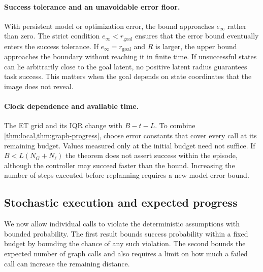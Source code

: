 \documentclass{article} %
\theoremstyle{definition}
\theoremstyle{remark}
\begin{document}
\paragraph{Success tolerance and an unavoidable error floor.}
With persistent model or optimization error, the bound approaches $e_\infty$ rather
than zero. The strict condition $e_\infty<r_{\mathrm{goal}}$ ensures that the error bound
eventually enters the success tolerance. If $e_\infty=r_{\mathrm{goal}}$ and $R$ is larger,
the upper bound approaches the boundary without reaching it in finite time.
If unsuccessful states can lie arbitrarily close to the goal latent, no positive
latent radius guarantees task success. This matters when the goal depends on
state coordinates that the image does not reveal.

\paragraph{Clock dependence and available time.}
The ET grid and its IQR change with $B-t-L$.
To combine \cref{thm:local,thm:graph-progress}, choose error constants that cover every
call at its remaining budget. Values measured only at the initial budget need not suffice.
If $B<L(N_G+N_\ell)$ the theorem does not assert success within the episode,
although the controller may succeed faster than the bound.
Increasing the number of steps executed before replanning requires a new model-error bound.

\subsection{Stochastic execution and expected progress}
\label{app:stochastic}
We now allow individual calls to violate the deterministic assumptions with bounded probability.
The first result bounds success probability within a fixed budget by bounding the chance
of any such violation. The second bounds the expected number of graph calls and also
requires a limit on how much a failed call can increase the remaining distance.
\end{document}
